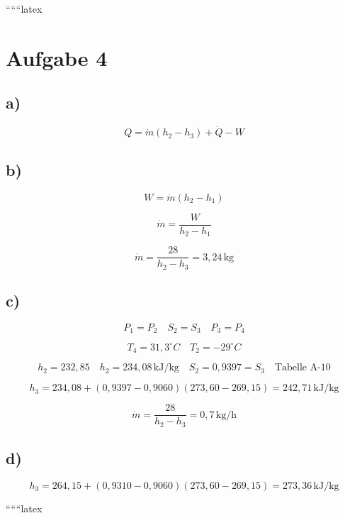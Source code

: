 
``````latex


\section*{Aufgabe 4}

\subsection*{a)}

\[
Q = \dot{m} (h_{2} - h_{3}) + \dot{Q} - W
\]

\subsection*{b)}

\[
W = \dot{m} (h_{2} - h_{1})
\]

\[
\dot{m} = \frac{W}{h_{2} - h_{1}}
\]

\[
\dot{m} = \frac{28}{h_{2} - h_{3}} = 3,24 \, \text{kg}
\]

\subsection*{c)}

\[
P_{1} = P_{2} \quad S_{2} = S_{3} \quad P_{3} = P_{4}
\]

\[
T_{4} = 31,3^\circ C \quad T_{2} = -29^\circ C
\]

\[
h_{2} = 232,85 \quad h_{2} = 234,08 \, \text{kJ/kg} \quad S_{2} = 0,9397 = S_{3} \quad \text{Tabelle A-10}
\]

\[
h_{3} = 234,08 + (0,9397 - 0,9060) \left(273,60 - 269,15\right) = 242,71 \, \text{kJ/kg}
\]

\[
\dot{m} = \frac{28}{h_{2} - h_{3}} = 0,7 \, \text{kg/h}
\]

\subsection*{d)}

\[
h_{3} = 264,15 + (0,9310 - 0,9060) \left(273,60 - 269,15\right) = 273,36 \, \text{kJ/kg}
\]

``````latex


